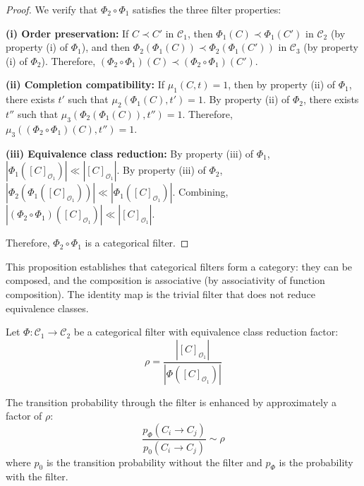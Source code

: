 \begin{proof}
We verify that $\Phi_2 \circ \Phi_1$ satisfies the three filter properties:

\textbf{(i) Order preservation:} If $C \prec C'$ in $\mathcal{C}_1$, then $\Phi_1(C) \prec \Phi_1(C')$ in $\mathcal{C}_2$ (by property (i) of $\Phi_1$), and then $\Phi_2(\Phi_1(C)) \prec \Phi_2(\Phi_1(C'))$ in $\mathcal{C}_3$ (by property (i) of $\Phi_2$). Therefore, $(\Phi_2 \circ \Phi_1)(C) \prec (\Phi_2 \circ \Phi_1)(C')$.

\textbf{(ii) Completion compatibility:} If $\mu_1(C, t) = 1$, then by property (ii) of $\Phi_1$, there exists $t'$ such that $\mu_2(\Phi_1(C), t') = 1$. By property (ii) of $\Phi_2$, there exists $t''$ such that $\mu_3(\Phi_2(\Phi_1(C)), t'') = 1$. Therefore, $\mu_3((\Phi_2 \circ \Phi_1)(C), t'') = 1$.

\textbf{(iii) Equivalence class reduction:} By property (iii) of $\Phi_1$, $|\Phi_1([C]_{\mathcal{O}_1})| \ll |[C]_{\mathcal{O}_1}|$. By property (iii) of $\Phi_2$, $|\Phi_2(\Phi_1([C]_{\mathcal{O}_1}))| \ll |\Phi_1([C]_{\mathcal{O}_1})|$. Combining, $|(\Phi_2 \circ \Phi_1)([C]_{\mathcal{O}_1})| \ll |[C]_{\mathcal{O}_1}|$.

Therefore, $\Phi_2 \circ \Phi_1$ is a categorical filter.
\end{proof}

This proposition establishes that categorical filters form a category: they can be composed, and the composition is associative (by associativity of function composition). The identity map is the trivial filter that does not reduce equivalence classes.

\begin{theorem}
\label{thm:filter_probability_formal}
Let $\Phi: \mathcal{C}_1 \to \mathcal{C}_2$ be a categorical filter with equivalence class reduction factor:
\begin{equation}
\rho = \frac{|[C]_{\mathcal{O}_1}|}{|\Phi([C]_{\mathcal{O}_1})|}
\label{eq:reduction_factor}
\end{equation}

The transition probability through the filter is enhanced by approximately a factor of $\rho$:
\begin{equation}
\frac{p_{\Phi}(C_i \to C_j)}{p_0(C_i \to C_j)} \sim \rho
\label{eq:probability_enhancement}
\end{equation}
where $p_0$ is the transition probability without the filter and $p_{\Phi}$ is the probability with the filter.
\end{theorem}

